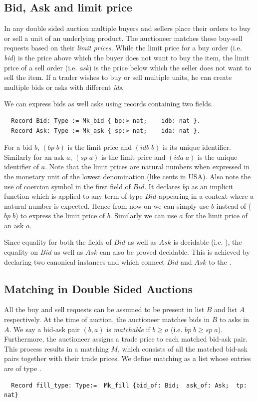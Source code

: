 \documentclass[a4paper,UKenglish,cleveref, autoref]{lipics-v2019}
\begin{document}
\subsection{Bid, Ask and limit price}
In  any double sided auction multiple buyers and sellers place their orders to buy or sell a unit of an underlying product. The auctioneer matches these buy-sell requests  based on their \emph{limit prices}. While the limit price for a buy order (i.e. \emph{bid}) is the price above which the buyer does not want to buy the item, the limit price of a sell order (i.e. \emph{ask}) is the price below which the seller does not want to sell the item. If a trader wishes to buy or sell multiple units, he can create multiple bids or asks with different \emph{ids}. 

We can express bids as well asks using  records containing two fields. 

\begin{verbatim}
  Record Bid: Type := Mk_bid { bp:> nat;    idb: nat }.
  Record Ask: Type := Mk_ask { sp:> nat;    ida: nat }.
\end{verbatim}

For a bid $b$, $(bp \; b)$  is the limit price and $(idb \; b)$ is its unique identifier. Similarly for an ask $a$, $(sp \; a)$ is the limit price and $(ida \; a)$ is the unique identifier of $a$. Note that the limit prices are natural numbers when expressed in the monetary unit of the lowest denomination (like cents in USA). Also note the use of coercion symbol \tw{ :>} in the first field of $Bid$. It declares $bp$ as an implicit function which is applied to any term of type $Bid$ appearing in a context where a natural number is expected. Hence from now on we can simply use $b$ instead of ($bp \;b$) to express the limit price of $b$. Similarly we can use $a$ for the limit price of an ask $a$.


Since equality for both the fields of $Bid$ as well as $Ask$ is decidable (i.e. ), the equality on $Bid$ as well as $Ask$ can also be proved decidable. This is achieved by declaring two canonical instances  and  which connect $Bid$ and $Ask$ to the .  

\subsection{Matching in Double Sided Auctions}
All the buy and sell requests can be assumed to be present in list $B$ and list $A$ respectively. At the time of auction, the auctioneer matches bids in $B$ to asks in $A$. We say a bid-ask pair $(b, a)$ is \emph{matchable} if $b \ge a$ (i.e. $bp \; b \ge sp \; a$).  Furthermore, the auctioneer assigns a trade price to each matched bid-ask pair. This  process results in  a matching $M$, which consists of all the matched bid-ask pairs together with their trade prices. We define matching as a list whose entries are of type .
\begin{verbatim}
  Record fill_type: Type:=  Mk_fill {bid_of: Bid;  ask_of: Ask;  tp: nat} 
\end{verbatim}
\end{document}
